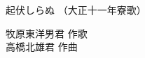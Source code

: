 \documentclass[10pt,b5j]{tarticle} %
\begin{document}
\begin{minipage}[c]{0.7\hsize} %
    \begin{center}
        {\LARGE
            起伏しらぬ %
        }
        {\small 
            （大正十一年寮歌） %
        }
    \end{center}
\end{minipage}
\begin{minipage}[c]{0.3\hsize} %
    \begin{flushright} %
        牧原東洋男君 作歌\\高橋北雄君 作曲 %
    \end{flushright}
\end{minipage}
\end{document}

